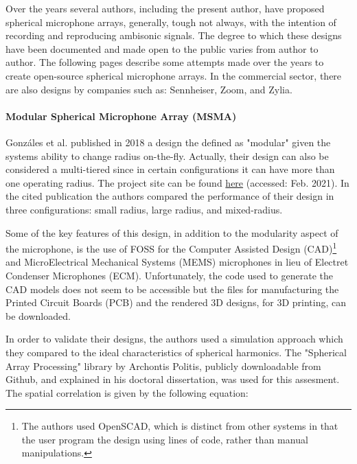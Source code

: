 
Over the years several authors, including the present author, have proposed spherical microphone arrays, generally, tough not always, with the intention of recording and reproducing ambisonic signals. The degree to which these designs have been documented and made open to the public varies from author to author. The following pages describe some attempts made over the years to create open-source spherical microphone arrays. In the commercial sector, there are also designs by companies such as: Sennheiser, Zoom, and Zylia. 

\paragraph{Modular Spherical Microphone Array (MSMA)}

Gonzáles et al. \cite{gonzalez2018modular} published in 2018 a design the defined as "modular" given the systems ability to change radius on-the-fly. Actually, their design can also be considered a multi-tiered since in certain configurations it can have more than one operating radius. The project site can be found \href{https://www.appropedia.org/Modular_Spherical_Microphone_Array}{here} (accessed: Feb. 2021). In the cited publication the authors compared the performance of their design in three configurations: small radius, large radius, and mixed-radius. 

Some of the key features of this design, in addition to the modularity aspect of the microphone, is the use of FOSS for the Computer Assisted Design (CAD)\footnote{The authors used OpenSCAD, which is distinct from other systems in that the user program the design using lines of code, rather than manual manipulations.} and MicroElectrical Mechanical Systems (MEMS) microphones in lieu of Electret Condenser Microphones (ECM). Unfortunately, the code used to generate the CAD models does not seem to be accessible but the files for manufacturing the Printed Circuit Boards (PCB) and the rendered 3D designs, for 3D printing, can be downloaded. 

In order to validate their designs, the authors used a simulation approach which they compared to the ideal characteristics of spherical harmonics. The "Spherical Array Processing" library by Archontis Politis, publicly downloadable from Github, and explained in his doctoral dissertation, was used for this assesment. The spatial correlation is given by the following equation: 


